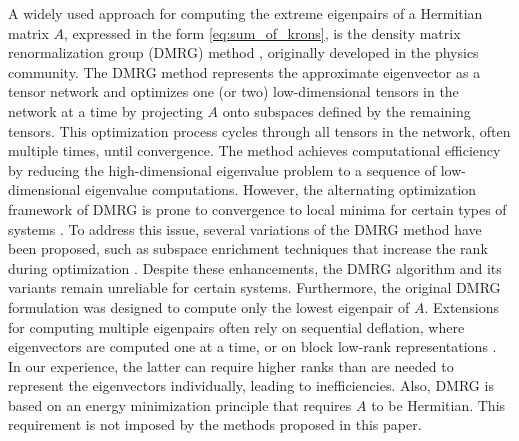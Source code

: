 \documentclass[10pt,preprint]{elsarticle}
\begin{document}
A widely used approach for computing the extreme eigenpairs of a Hermitian matrix $A$, expressed in the form \eqref{eq:sum_of_krons}, is the density matrix renormalization group (DMRG) method \cite{Schollwock2005,Schollwock2011,White1993}, originally developed in the physics community. The DMRG method represents the approximate eigenvector as a tensor network and optimizes one (or two) low-dimensional tensors in the network at a time by projecting $A$ onto subspaces defined by the remaining tensors. This optimization process cycles through all tensors in the network, often multiple times, until convergence. The method achieves computational efficiency by reducing the high-dimensional eigenvalue problem to a sequence of low-dimensional eigenvalue computations. However, the alternating optimization framework of DMRG is prone to convergence to local minima for certain types of systems \cite{White2005}. 
%
To address this issue, several variations of the DMRG method have been proposed, such as subspace enrichment techniques that increase the rank during optimization \cite{Dolgov2015}. Despite these enhancements, the DMRG algorithm and its variants remain unreliable for certain systems. Furthermore, the original DMRG formulation was designed to compute only the lowest eigenpair of $A$. Extensions for computing multiple eigenpairs often rely on sequential deflation, where eigenvectors are computed one at a time, or on block low-rank representations \cite{dolgov2014,kressner2014,HuChan2015,MBLExcitedDMRG}. In our experience, the latter can require higher ranks than are needed to represent the eigenvectors individually, leading to inefficiencies. Also, DMRG is based on an energy minimization principle that requires $A$ to be Hermitian. This requirement is not imposed by the methods proposed in this paper.
\end{document}

